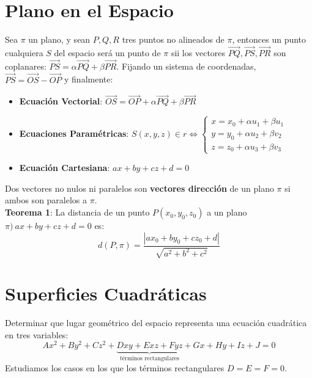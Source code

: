 \documentclass[11pt,a4paper]{article}
\begin{document}
\section{Plano en el Espacio}
Sea $\pi$ un plano, y sean $P,Q,R$ tres puntos no alineados de $\pi$, entonces un punto cualquiera $S$ del espacio ser\'a un punto de $\pi$ sii los vectores $\overrightarrow{PQ}, \overrightarrow{PS}, \overrightarrow{PR}$ son coplanares: 
$\overrightarrow{PS} = \alpha \overrightarrow{PQ} + \beta \overrightarrow{PR}$. Fijando un sistema de coordenadas, $\overrightarrow{PS} = \overrightarrow{OS} - \overrightarrow{OP}$ y finalmente:
\begin{itemize}
\itemsep-0.3em
\item \textbf{Ecuaci\'on Vectorial}: $\overrightarrow{OS} = \overrightarrow{OP} + \alpha \overrightarrow{PQ} + \beta \overrightarrow{PR}$
\item \textbf{Ecuaciones Param\'etricas}: $S(x,y,z) \in r \iff \left\{ \begin{array}{l} x = x_0 + \alpha u_1 + \beta u_1 \\ y = y_0 + \alpha u_2 + \beta v_2 \\ z = z_0 + \alpha u_3 + \beta v_3 \end{array} \right.$
\item \textbf{Ecuaci\'on Cartesiana}: $ax + by + cz + d = 0$
\end{itemize}

Dos vectores no nulos ni paralelos son \textbf{vectores direcci\'on} de un plano $\pi$ si ambos son paralelos a $\pi$.\\

\textbf{Teorema 1}: La distancia de un punto $P(x_0, y_0, z_0)$ a un plano $\pi)\ ax+by+cz+d=0$ es: $$d(P, \pi) = \dfrac{|ax_0 + by_0 + cz_0 + d|}{\sqrt{a^2 + b^2 + c^2}}$$

\section{Superficies Cuadr\'aticas}
Determinar que lugar geom\'etrico del espacio representa una ecuaci\'on cuadr\'atica en tres variables:
$$Ax^2 + By^2 + Cz^2 + \underbrace{Dxy + Exz + Fyz}_{\text{t\'erminos rectangulares}} + Gx + Hy + Iz + J = 0$$
Estudiamos los casos en los que los t\'erminos rectangulares $D = E = F = 0$.

\newpage
\end{document}
